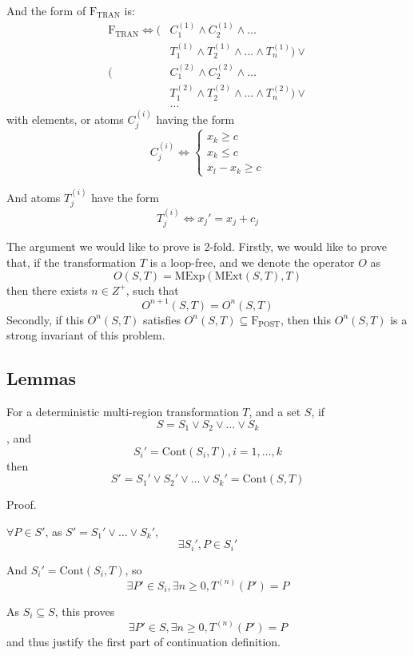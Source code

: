 \documentclass[letterpaper,]{article}
\providecommand{\tightlist}{%
  \setlength{\itemsep}{0pt}\setlength{\parskip}{0pt}}
\begin{document}
And the form of \(\mathrm{F_{TRAN}}\) is: \[\begin{split}
\mathrm{F_{TRAN}}\Leftrightarrow ( &C_1^{(1)} \land C_2^{(1)} \land \dots
\\ &T^{(1)}_1 \land T^{(1)}_2 \land \dots \land T^{(1)}_n) \lor \\
( &C_1^{(2)} \land C_2^{(2)} \land \dots
\\ &T^{(2)}_1 \land T^{(2)}_2 \land \dots \land T^{(2)}_n) \lor \\
& \dots
\end{split}\] with elements, or atoms \(C_j^{(i)}\) having the form
\[C_j^{(i)} \Leftrightarrow  \begin{cases}x_k \ge c   \\ x_k \le c \\ x_l - x_k \ge c \end{cases}\]

And atoms \(T_j^{(i)}\) have the form
\[T_j^{(i)} \Leftrightarrow x_j' = x_j + c_j \]

The argument we would like to prove is 2-fold. Firstly, we would like to
prove that, if the transformation \(T\) is a loop-free, and we denote
the operator \(O\) as
\[O(S, T) = \mathrm{MExp}(\mathrm{MExt}(S, T), T) \] then there exists
\(n \in Z^{+}\), such that \[O^{n+1}(S, T) = O^{n}(S, T)\] Secondly, if
this \(O^n(S, T)\) satisfies \(O^n(S, T)\subseteq \mathrm{F_{POST}}\),
then this \(O^n(S, T)\) is a strong invariant of this problem.

\hypertarget{lemmas}{%
\subsection{Lemmas}\label{lemmas}}

\begin{description}
\tightlist
\item[Lemma 6]
For a deterministic multi-region transformation \(T\), and a set \(S\),
if \[ S = S_1 \lor S_2 \lor \dots \lor S_k \], and
\[S_i' = \mathrm{Cont}(S_i, T), i = 1, \dots, k\] then
\[S' = S_1' \lor S_2' \lor \dots \lor S_k' = \mathrm{Cont}(S, T) \]
\end{description}

Proof.

\(\forall P \in S'\), as \(S' = S_1' \lor \dots \lor S_k'\),
\[\exists S_i', P \in S_i'\]

And \(S_i' = \mathrm{Cont}(S_i, T)\), so
\[\exists P' \in S_i, \exists n \ge 0, T^{(n)}(P') = P\]

As \(S_i \subseteq S\), this proves
\[\exists P' \in S, \exists n \ge 0, T^{(n)}(P') = P\] and thus justify
the first part of continuation definition.
\end{document}
